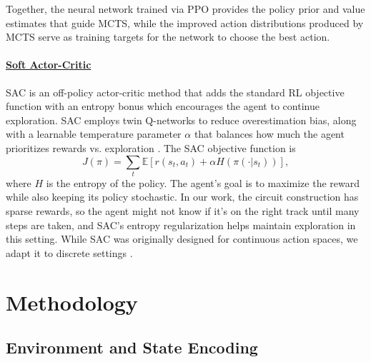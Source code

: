 \documentclass{article} %
\begin{document}
Together, the neural network trained via PPO provides the policy prior and value estimates that guide MCTS, while the improved action distributions produced by MCTS serve as training targets for the network to choose the best action.

\paragraph{\underline{Soft Actor-Critic}}

SAC is an off-policy actor-critic method that adds the standard RL objective function with an entropy bonus which encourages the agent to continue exploration. SAC employs twin Q-networks to reduce overestimation bias, along with a learnable temperature parameter $\alpha$ that balances how much the agent prioritizes rewards vs. exploration \citep{Haarnoja2018SAC}. The SAC objective function is $$J(\pi) = \sum_t \mathbb{E}\left[ r(s_t, a_t) + \alpha H(\pi(\cdot | s_t)) \right],$$ where $H$ is the entropy of the policy. The agent's goal is to maximize the reward while also keeping its policy stochastic. In our work, the circuit construction has sparse rewards, so the agent might not know if it's on the right track until many steps are taken, and SAC's entropy regularization helps maintain exploration in this setting. While SAC was originally designed for continuous action spaces, we adapt it to discrete settings \citep{christodoulou2019sacdiscrete}.





\section{Methodology}
\label{sec:methods}
\subsection{Environment and State Encoding}
\end{document}
